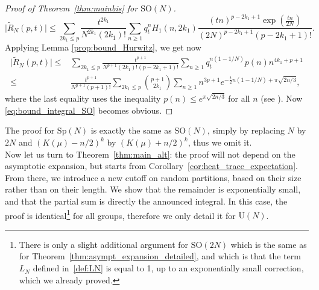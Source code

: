 \documentclass[11pt,a4paper,reqno]{article}
\theoremstyle{definition}
\theoremstyle{remark}
\newcommand\SO{{\mathrm{SO}}}
\newcommand\Sp{{\mathrm{Sp}}}
\newcommand\U{{\mathrm U}}
\begin{document}
\begin{proof}[Proof of Theorem~\ref{thm:mainbis} for $\SO(N)$]
\[
\vert \tilde{R}_{N}(p,t)\vert\leq \sum_{2k_1\leq p}\frac{t^{2k_1}}{N^{2k_1}(2k_1)!}\sum_{n\geq 1}q_t^n H_1(n,2k_1)\frac{(tn)^{p-2k_1+1}\exp(\frac{tn}{2N})}{(2N)^{p-2k_1+1}(p-2k_1+1)!}.
\]
Applying Lemma \ref{prop:bound_Hurwitz}, we get now
\begin{align*}
\vert \tilde{R}_{N}(p,t)\vert\leq & \sum_{2k_1\leq p}\frac{t^{p+1}}{N^{p+1}(2k_1)!(p-2k_1+1)!}\sum_{n\geq 1}q_t^{n(1-1/N)} p(n)n^{4k_1+p+1}\\
\leq & \frac{t^{p+1}}{N^{p+1}(p+1)!}\sum_{2k_1\leq p}\binom{p+1}{2k_1}\sum_{n\geq 1}n^{3p+1}e^{-\frac{t}{2}n(1-1/N)+\pi\sqrt{2n/3}},
\end{align*}
where the last equality uses the inequality $p(n)\leq e^{\pi\sqrt{2n/3}}$ for all $n$ (see \cite[Theorem 14.5]{Apo}). Now \eqref{eq:bound_integral_SO} becomes obvious.
\end{proof}

The proof for $\Sp(N)$ is exactly the same as $\SO(N)$, simply by replacing $N$ by $2N$ and $(K(\mu)-n/2)^k$ by $(K(\mu)+n/2)^k$, thus we omit it.\\

Now let us turn to Theorem~\ref{thm:main_alt}: the proof will not depend on the asymptotic expansion, but starts from Corollary~\ref{cor:heat_trace_expectation}. From there, we introduce a new cutoff on random partitions, based on their size rather than on their length. We show that the remainder is exponentially small, and that the partial sum is directly the announced integral. In this case, the proof is identical\footnote{There is only a slight additional argument for $\SO(2N)$ which is the same as for Theorem~\ref{thm:asympt_expansion_detailed}, and which is that the term $L_N$ defined in~\eqref{def:LN} is equal to 1, up to an exponentially small correction, which we already proved.} for all groups, therefore we only detail it for $\U(N)$.
\end{document}
